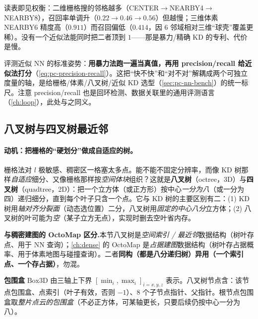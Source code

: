 \noindent 读表即见权衡：二维栅格搜的邻格越多（CENTER$\to$NEARBY4$\to$NEARBY8），召回率单调升（$0.22{\to}0.46{\to}0.56$）但越慢；三维体素 NEARBY6 精度高（$0.911$）而召回偏低（$0.414$，因 $6$ 邻域相对三维“球壳”覆盖更稀）。没有一个近似法能同时把二者顶到 $1$——那是暴力/精确 KD 的专利、代价是慢。

\begin{insight}
评测近似 NN 的标准姿势：\textbf{用暴力法跑一遍当真值，再用 precision/recall 给近似法打分}（\cref{eq:pc-precision-recall}）。这把“快不快”和“对不对”解耦成两个可独立度量的轴，是给栅格/体素/八叉树/近似 KD 选型（\cref{sec:pc-nn-bench}）的统一标尺。注意 precision/recall 也是回环检测、数据关联里的通用评测语言（\cref{ch:loop}），此处与之同义。
\end{insight}

\subsection{八叉树与四叉树最近邻}
\label{sec:pc-octree}

\paragraph{动机：把栅格的“硬划分”做成自适应的树。}
栅格法对 $l$ 极敏感、稠密区一格塞太多点。能不能不固定分辨率，而像 KD 树那样\emph{自适应}细分、又像栅格那样按\emph{空间体块}组织？这就是\textbf{八叉树}（octree，3D）与\textbf{四叉树}（quadtree，2D）：把一个立方体（或正方形）按中心\emph{一分为八}（或一分为四）递归细分，直到每个叶子只含一个点\cite{gao2023slamad}。它与 KD 树的主要区别有二：(1) KD 树用\emph{轴对齐分裂面}（动态选位置）二分，八叉树用\emph{固定的中心八分}立方体；(2) 八叉树的叶可能为\emph{空}（某子立方无点），实现时删去空叶省内存。

\begin{note}
\textbf{与稠密建图的 OctoMap 区分.}\;本节八叉树是\emph{空间索引 / 最近邻}数据结构（树叶存点、用于 NN 查询）；\cref{ch:dense} 的 OctoMap 是\emph{占据建图}数据结构（树叶存占据概率、用于体素地图与碰撞查询）。二者\textbf{同构（都是八分递归树）异用（一个索引点、一个存占据）}，勿混。
\end{note}

\begin{definition}\label{def:pc-octree-node}
\textbf{包围盒} $\mathrm{Box3D}$ 由三轴上下界 $[\min_i,\max_i]_{i=x,y,z}$ 表示。八叉树节点含：该节点包围盒、点索引（叶子有效，否则 $-1$）、$8$ 个子节点指针、父指针。根节点包围盒取\emph{整片点云的包围盒}（不必正方体，可某轴更长，只要后续仍按中心一分为八）。
\end{definition}

